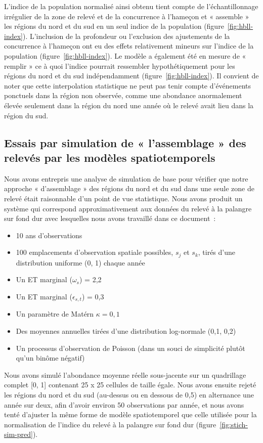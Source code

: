 \documentclass[french,11pt]{book}
\begin{document}
L'indice de la population normalisé ainsi obtenu tient compte de l'échantillonnage irrégulier de la zone de relevé et de la concurrence à l'hameçon et « assemble » les régions du nord et du sud en un seul indice de la population (figure~\ref{fig:hbll-index}). L'inclusion de la profondeur ou l'exclusion des ajustements de la concurrence à l'hameçon ont eu des effets relativement mineurs sur l'indice de la population (figure~\ref{fig:hbll-index}). Le modèle a également été en mesure de « remplir » ce à quoi l'indice pourrait ressembler hypothétiquement pour les régions du nord et du sud indépendamment (figure~\ref{fig:hbll-index}). Il convient de noter que cette interpolation statistique ne peut pas tenir compte d'événements ponctuels dans la région non observée, comme une abondance anormalement élevée seulement dans la région du nord une année où le relevé avait lieu dans la région du sud.

\hypertarget{sec:hbll-sim}{%
\subsection{Essais par simulation de « l'assemblage » des relevés par les modèles spatiotemporels}\label{sec:hbll-sim}}

Nous avons entrepris une analyse de simulation de base pour vérifier que notre approche « d'assemblage » des régions du nord et du sud dans une seule zone de relevé était raisonnable d'un point de vue statistique. Nous avons produit un système qui correspond approximativement aux données du relevé à la palangre sur fond dur avec lesquelles nous avons travaillé dans ce document~:
\begin{itemize}

\item
  10 ans d'observations
\item
  100 emplacements d'observation spatiale possibles, \(s_j\) et \(s_k\), tirés d'une distribution uniforme (0, 1) chaque année
\item
  Un ET marginal (\(\omega_s\)) = 2,2
\item
  Un ET marginal (\(\epsilon_{s,t}\)) = 0,3
\item
  Un paramètre de \mbox{Mat\'ern} \(\kappa = 0,1\)
\item
  Des moyennes annuelles tirées d'une distribution log-normale (0,1, 0,2)
\item
  Un processus d'observation de Poisson (dans un souci de simplicité plutôt qu'un binôme négatif)
\end{itemize}
Nous avons simulé l'abondance moyenne réelle sous-jacente sur un quadrillage complet {[}0, 1{]} contenant 25 x 25 cellules de taille égale. Nous avons ensuite rejeté les régions du nord et du sud (au-dessus ou en dessous de 0,5) en alternance une année sur deux, afin d'avoir environ 50 observations par année, et nous avons tenté d'ajuster la même forme de modèle spatiotemporel que celle utilisée pour la normalisation de l'indice du relevé à la palangre sur fond dur (figure~\ref{fig:stich-sim-pred}).
\end{document}
